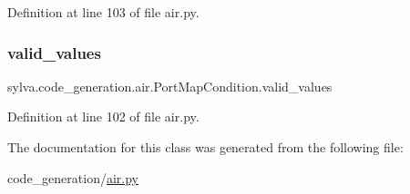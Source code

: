 Definition at line 103 of file air.\+py.

\mbox{\label{classsylva_1_1code__generation_1_1air_1_1_port_map_condition_a98936107f0135352da9608e71fcdf69e}} 
\subsubsection{\texorpdfstring{valid\+\_\+values}{valid\_values}}
{\footnotesize\ttfamily sylva.\+code\+\_\+generation.\+air.\+Port\+Map\+Condition.\+valid\+\_\+values}



Definition at line 102 of file air.\+py.



The documentation for this class was generated from the following file\+:\begin{DoxyCompactItemize}
\item 
code\+\_\+generation/\hyperlink{air_8py}{air.\+py}\end{DoxyCompactItemize}
